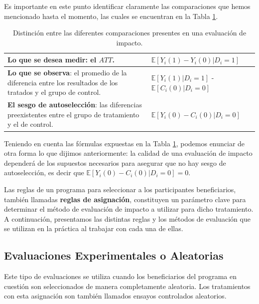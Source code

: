 \documentclass[../../main.tex]{subfiles}
\begin{document}
\bigskip
Es importante en este punto identificar claramente las comparaciones que hemos
mencionado hasta el momento, las cuales se encuentran en la Tabla \ref{tab:distinciones}.
\begin{table}[h!]
    \centering
    \begin{tabular}{p{7cm}m{7cm}}  %
        \hline
        \textbf{Lo que se desea medir}: el \(ATT\). & \(\mathbb{E} \left[Y_i(1)-Y_i(0)|D_i=1\right]\) \\
        \hline
        \textbf{Lo que se observa}: el promedio de la diferencia entre los resultados de
        los tratados y el grupo de control. & \(\mathbb{E} \left[Y_i(1)|D_i=1\right]\) -
        \(\mathbb{E} \left[C_i(0)|D_i=0\right]\) \\
        \hline
        \textbf{El sesgo de autoselección}: las diferencias preexistentes entre el grupo de
        tratamiento y el de control. & \(\mathbb{E} \left[Y_i(0)-C_i(0)|D_i=0\right]\) \\
        \hline
    \end{tabular}
    \caption{Distinción entre las diferentes comparaciones presentes en una evaluación de impacto.}
    \label{tab:distinciones}
\end{table}

Teniendo en cuenta las fórmulas expuestas en la Tabla \ref{tab:distinciones}, podemos
enunciar de otra forma lo que dijimos anteriormente: la calidad de una evaluación de
impacto dependerá de los supuestos necesarios para asegurar que no hay sesgo de autoselección,
es decir que \(\mathbb{E} \left[Y_i(0)-C_i(0)|D_i=0\right] = 0\).

\bigskip
Las reglas de un programa para seleccionar a los participantes beneficiarios, también
llamadas \textbf{reglas de asignación}, constituyen un parámetro clave para determinar el
método de evaluación de impacto a utilizar para dicho tratamiento. A continuación,
presentamos las distintas reglas y los métodos de evaluación que se utilizan en la
práctica al trabajar con cada una de ellas.

\subsection{Evaluaciones Experimentales o Aleatorias}
Este tipo de evaluaciones se utiliza cuando los beneficiarios del programa en cuestión son
seleccionados de manera completamente aleatoria\footnotemark. Los tratamientos con esta
asignación son también llamados ensayos controlados aleatorios. 
\end{document}
